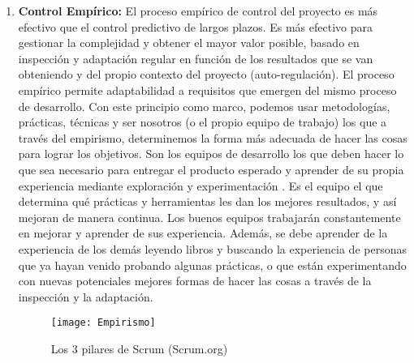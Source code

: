 \begin{enumerate}

\item \textbf{Control Empírico:} El proceso empírico de control del proyecto es más efectivo que el control predictivo de largos plazos. Es más efectivo para gestionar la complejidad y obtener el mayor valor posible, basado en inspección y adaptación regular en función de los resultados que se van obteniendo y del propio contexto del proyecto (auto-regulación). El proceso empírico permite adaptabilidad a requisitos que emergen del mismo proceso de desarrollo. Con este principio como marco, podemos usar metodologías, prácticas, técnicas y ser nosotros (o el propio equipo de trabajo) los que a través del empirismo, determinemos la forma más adecuada de hacer las cosas para lograr los objetivos. Son los equipos de desarrollo los que deben hacer lo que sea necesario para entregar el producto esperado y aprender de su propia experiencia mediante exploración y experimentación \cite{UNTREF-2014}. Es el equipo el que determina qué prácticas y herramientas les dan los mejores resultados, y así mejoran de manera continua. Los buenos equipos trabajarán constantemente en mejorar y aprender de sus experiencia. Además, se debe aprender de la experiencia de los demás leyendo libros y buscando la experiencia de personas que ya hayan venido probando algunas prácticas, o que están experimentando con nuevas potenciales mejores formas de hacer las cosas a través de la inspección y la adaptación. 

\begin{figure}[h]
  \centering
  \texttt{[image: Empirismo]}
  \caption{Los 3 pilares de Scrum (Scrum.org)}
  \centering
  \label{fig:Empirismo} %
\end{figure}


\end{enumerate}
